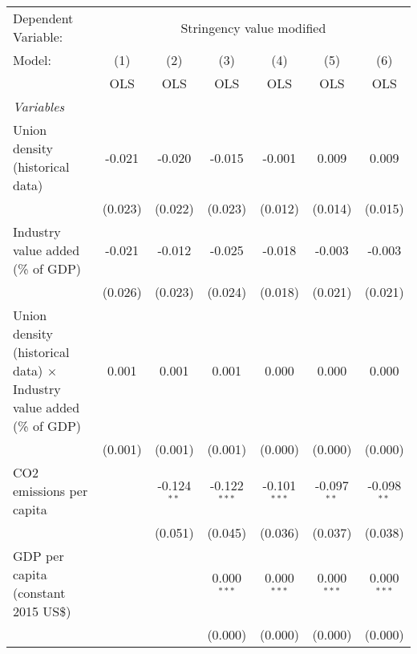 
\begingroup
\centering
\begin{tabular}{lcccccc}
   \toprule
   Dependent Variable: & \multicolumn{6}{c}{Stringency value modified}\\
   Model:                                                                      & (1)     & (2)           & (3)            & (4)            & (5)           & (6)\\  
                                                                               &  OLS    & OLS           & OLS            & OLS            & OLS           & OLS\\  
   \midrule
   \emph{Variables}\\
   Union density (historical data)                                             & -0.021  & -0.020        & -0.015         & -0.001         & 0.009         & 0.009\\   
                                                                               & (0.023) & (0.022)       & (0.023)        & (0.012)        & (0.014)       & (0.015)\\   
   Industry value added (\% of GDP)                                            & -0.021  & -0.012        & -0.025         & -0.018         & -0.003        & -0.003\\   
                                                                               & (0.026) & (0.023)       & (0.024)        & (0.018)        & (0.021)       & (0.021)\\   
   Union density (historical data) $\times$ Industry value added (\% of GDP)   & 0.001   & 0.001         & 0.001          & 0.000          & 0.000         & 0.000\\   
                                                                               & (0.001) & (0.001)       & (0.001)        & (0.000)        & (0.000)       & (0.000)\\   
   CO2 emissions per capita                                                    &         & -0.124$^{**}$ & -0.122$^{***}$ & -0.101$^{***}$ & -0.097$^{**}$ & -0.098$^{**}$\\   
                                                                               &         & (0.051)       & (0.045)        & (0.036)        & (0.037)       & (0.038)\\   
   GDP per capita (constant 2015 US\$)                                         &         &               & 0.000$^{***}$  & 0.000$^{***}$  & 0.000$^{***}$ & 0.000$^{***}$\\   
                                                                               &         &               & (0.000)        & (0.000)        & (0.000)       & (0.000)\\   

\end{tabular}
